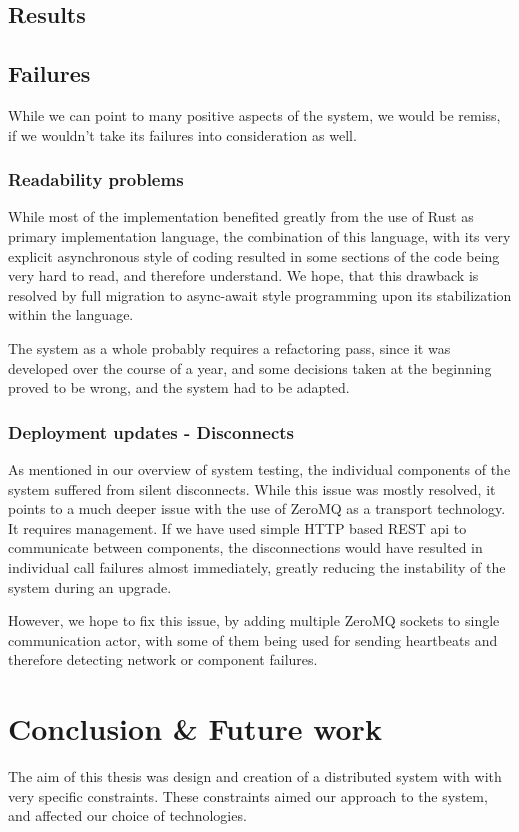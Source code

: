 \section{Results}



\section{Failures}
While we can point to many positive aspects of the system, we would be remiss, if we wouldn't take its failures
into consideration as well.

\subsection{Readability problems}
While most of the implementation benefited greatly from the use of Rust as primary implementation language, the combination
of this language, with its very explicit asynchronous style of coding resulted in some sections of the code being
very hard to read, and therefore understand. We hope, that this drawback is resolved by full migration
to async-await style programming upon its stabilization within the language.

The system as a whole probably requires a refactoring pass, since it was developed over the course of a year,
and some decisions taken at the beginning proved to be wrong, and the system had to be adapted.

\subsection{Deployment updates - Disconnects}
As mentioned in our overview of system testing, the individual components of the system suffered from silent disconnects.
While this issue was mostly resolved, it points  to a much deeper issue with the use of ZeroMQ as a transport technology.
It requires management. If we have used simple HTTP based REST api to communicate between components, the disconnections
would have resulted in individual call failures almost immediately, greatly reducing the instability of the system during
an upgrade.

However, we hope to fix this issue, by adding multiple ZeroMQ sockets to single communication actor, with some
of them being used for sending heartbeats and therefore detecting network or component failures.

\chapter{Conclusion \& Future work}
The aim of this thesis was design and creation of a distributed system with with very specific constraints.
These constraints aimed our approach to the system, and affected our choice of technologies.

